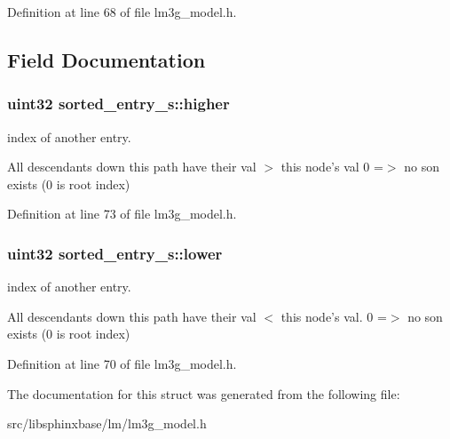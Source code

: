 Definition at line 68 of file lm3g\-\_\-model.\-h.



\subsection{Field Documentation}
\subsubsection[{higher}]{\setlength{\rightskip}{0pt plus 5cm}uint32 sorted\-\_\-entry\-\_\-s\-::higher}\label{structsorted__entry__s_a0b7f0225403703a4daa3780593db7237}


index of another entry. 

All descendants down this path have their val $>$ this node's val 0 =$>$ no son exists (0 is root index) 

Definition at line 73 of file lm3g\-\_\-model.\-h.

\subsubsection[{lower}]{\setlength{\rightskip}{0pt plus 5cm}uint32 sorted\-\_\-entry\-\_\-s\-::lower}\label{structsorted__entry__s_a248960abac597c0f615ab01822f6d559}


index of another entry. 

All descendants down this path have their val $<$ this node's val. 0 =$>$ no son exists (0 is root index) 

Definition at line 70 of file lm3g\-\_\-model.\-h.



The documentation for this struct was generated from the following file\-:\begin{DoxyCompactItemize}
\item 
src/libsphinxbase/lm/lm3g\-\_\-model.\-h\end{DoxyCompactItemize}
